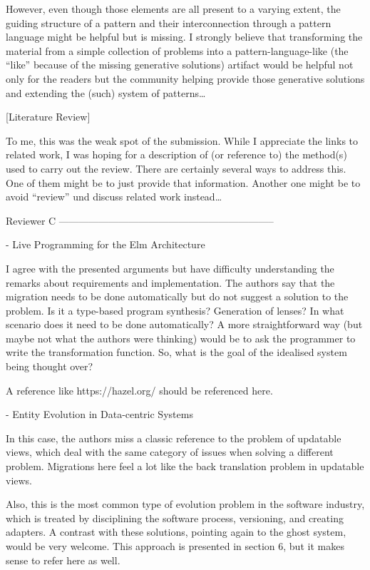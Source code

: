 However, even though those elements are all present to a varying extent, the guiding structure of a pattern and their interconnection through a pattern language might be helpful but is missing. I strongly believe that transforming the material from a simple collection of problems into a pattern-language-like (the “like” because of the missing generative solutions) artifact would be helpful not only for the readers but the community helping provide those generative solutions and extending the (such) system of patterns…

[Literature Review]

To me, this was the weak spot of the submission. While I appreciate the links to related work, I was hoping for a description of (or reference to) the method(s) used to carry out the review. There are certainly several ways to address this. One of them might be to just provide that information. Another one might be to avoid “review” und discuss related work instead…


Reviewer C
-----------------------------------------------------------------

- Live Programming for the Elm Architecture

I agree with the presented arguments but have difficulty understanding the remarks about requirements and implementation. The authors say that the migration needs to be done automatically but do not suggest a solution to the problem. Is it a type-based program synthesis? Generation of lenses? In what scenario does it need to be done automatically? A more straightforward way (but maybe not what the authors were thinking) would be to ask the programmer to write the transformation function. So, what is the goal of the idealised system being thought over?

A reference like https://hazel.org/ should be referenced here.

- Entity Evolution in Data-centric Systems

In this case, the authors miss a classic reference to the problem of updatable views, which deal with the same category of issues when solving a different problem. Migrations here feel a lot like the back translation problem in updatable views.

Also, this is the most common type of evolution problem in the software industry, which is treated by disciplining the software process, versioning, and creating adapters. A contrast with these solutions, pointing again to the ghost system, would be very welcome. This approach is presented in section 6, but it makes sense to refer here as well.


